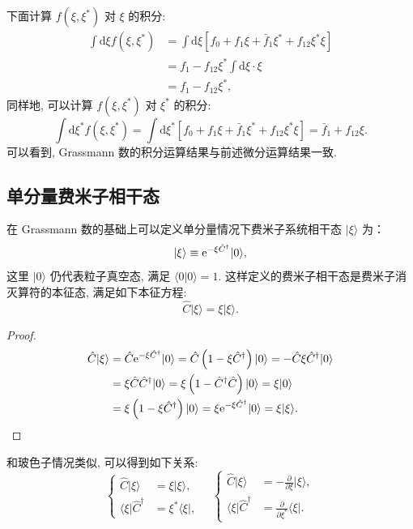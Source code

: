 下面计算 $f\left(\xi, \xi^{*}\right)$ 对 $\xi$ 的积分:
\begin{align}
\int \mathrm{d} \xi f\left(\xi, \xi^{*}\right) &=\int \mathrm{d} \xi\left[f_{0}+f_{1} \xi+\bar{f}_{1} \xi^{*}+f_{12} \xi^{*} \xi\right]\nonumber \\
&=f_{1}-f_{12} \xi^{*} \int \mathrm{d} \xi \cdot   \xi \nonumber\\
&=f_{1}-f_{12} \xi^{*},
\end{align}
同样地, 可以计算 $f\left(\xi, \xi^{*}\right)$ 对 $\xi ^*$ 的积分:
\begin{equation}
\int \mathrm{d} \xi^* f\left(\xi, \xi^{*}\right) =\int \mathrm{d} \xi^*\left[f_{0}+f_{1} \xi+\bar{f}_{1} \xi^{*}+f_{12} \xi^{*} \xi\right] =\bar{f}_{1}+f_{12} \xi.
\end{equation}
可以看到, Grassmann 数的积分运算结果与前述微分运算结果一致.

\subsection{单分量费米子相干态}
在 Grassmann 数的基础上可以定义单分量情况下费米子系统相干态 $|\xi\rangle$ 为：
\begin{equation}
|\xi\rangle \equiv \mathrm{e}^{-\xi \hat{C}^{\dagger}}|0\rangle,
\end{equation}
这里 $|0\rangle$ 仍代表粒子真空态, 满足 $\langle 0 | 0\rangle=1$. 这样定义的费米子相干态是费米子消灭算符的本征态, 满足如下本征方程:
\begin{equation}
\hat{C}|\xi\rangle=\xi|\xi\rangle.
\end{equation}
\begin{proof}
\begin{align}
\hat{C}|\xi\rangle&=\hat{C} \mathrm{e}^{-\xi \hat{C}^{\dagger}}|0\rangle=\hat{C}\left(1-\xi \hat{C}^{\dagger}\right)|0\rangle=-\hat{C} \xi \hat{C}^{\dagger}|0\rangle\nonumber\\
&=\xi \hat{C} \hat{C}^{\dagger}|0\rangle=\xi\left(1-\hat{C}^{\dagger} \hat{C}\right)|0\rangle=\xi|0\rangle\nonumber\\
&=\xi\left(1-\xi \hat{C}^{\dagger}\right)|0\rangle=\xi \mathrm{e}^{-\xi \hat{C}^{\dagger}}|0\rangle=\xi|\xi\rangle .
\end{align}
\end{proof}
和玻色子情况类似, 可以得到如下关系:
\begin{equation}
\left\{\begin{aligned} \hat{C}|\xi\rangle &=\xi|\xi\rangle, \\\langle\xi| \hat{C}^{\dagger} &=\xi^{*}\langle\xi|, \end{aligned}\right.\quad\left\{\begin{aligned}\hat{C}|\xi\rangle & =-\frac{\partial}{\partial \xi}|\xi\rangle, \\ \langle\xi| \hat{C}^{\dagger} & =\frac{\partial}{\partial \xi^{*}}\langle\xi| .\end{aligned}\right.
\end{equation}

